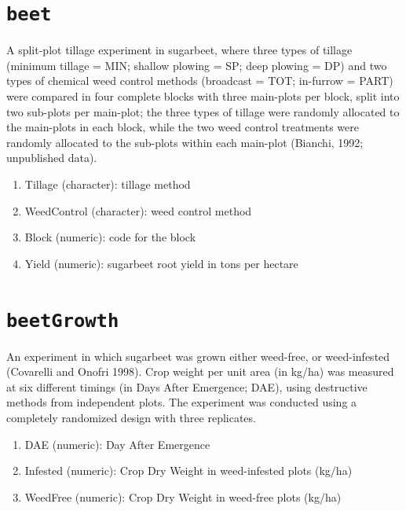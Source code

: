 \documentclass[
  letterpaper,
  DIV=11,
  numbers=noendperiod]{scrreprt}
\providecommand{\tightlist}{%
  \setlength{\itemsep}{0pt}\setlength{\parskip}{0pt}}
\begin{document}
\section*{\texorpdfstring{\texttt{beet}}{beet}}\label{beet}


A split-plot tillage experiment in sugarbeet, where three types of
tillage (minimum tillage = MIN; shallow plowing = SP; deep plowing = DP)
and two types of chemical weed control methods (broadcast = TOT;
in-furrow = PART) were compared in four complete blocks with three
main-plots per block, split into two sub-plots per main-plot; the three
types of tillage were randomly allocated to the main-plots in each
block, while the two weed control treatments were randomly allocated to
the sub-plots within each main-plot (Bianchi, 1992; unpublished data).

\begin{enumerate}
\def\labelenumi{\arabic{enumi}.}
\tightlist
\item
  Tillage (character): tillage method
\item
  WeedControl (character): weed control method
\item
  Block (numeric): code for the block
\item
  Yield (numeric): sugarbeet root yield in tons per hectare
\end{enumerate}

\section*{\texorpdfstring{\texttt{beetGrowth}}{beetGrowth}}\label{beetgrowth}


An experiment in which sugarbeet was grown either weed-free, or
weed-infested (Covarelli and Onofri 1998). Crop weight per unit area (in
kg/ha) was measured at six different timings (in Days After Emergence;
DAE), using destructive methods from independent plots. The experiment
was conducted using a completely randomized design with three
replicates.

\begin{enumerate}
\def\labelenumi{\arabic{enumi}.}
\tightlist
\item
  DAE (numeric): Day After Emergence
\item
  Infested (numeric): Crop Dry Weight in weed-infested plots (kg/ha)
\item
  WeedFree (numeric): Crop Dry Weight in weed-free plots (kg/ha)
\end{enumerate}
\end{document}
